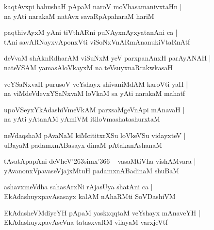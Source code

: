 \documentclass[twoside,12pt,openright]{book}
\def\S{\char'263}
\newcounter{shloka}[chapter]
\begin{document}
\begin{shloka}
kaqtAvxpi bahushaH pApaM naroV moVhasamanivxtaHn |\\
na yAti narakaM natAvx savaRpApaharaM hariM 
\end{shloka}

\begin{shloka}
paqthivAyxM yAni tiVthARni puNAyxnAyxyatanAni ca |\\
tAni savARNayxvAponxVti viSoNxVnARmAnanukiVtaRnAtf 
\end{shloka}

\begin{shloka}
deVvaM shAknRdharAM viSuNxM yeV parxpanAnxH parAyANAH |\\
nateVSAM yamasAloVkayxM na teVsuyxnaRrakwkasaH 
\end{shloka}

\begin{shloka}
veYSaNxvaH purusoV veYshayx shivaniMdAM karoVti yaH |\\
na viMdeVdevxYSaNxvaM loVkaM sa yAti narakaM mahatf 
\end{shloka}

\begin{shloka}
upoVSeyxYkAdashiVmeVkAM parxsaMgeVnApi mAnavaH |\\
na yAti yAtanAM yAmiVM itiloVmashatashurxtaM 
\end{shloka}

\begin{shloka}
neVdaqshaM pAvaNaM kiMcititxrXSu loVkeVSu vidayxteV |\\
uBayaM padamxnABasayx dinaM pAtakanAshanaM 
\end{shloka}

\begin{shloka}
tAvatApapAni deVheV\S simx\char'366 ~ vasaMtiVha vishAMvara |\\
yAvanonxVpavaseVjajxMtuH padamxnABadinaM shuBaM 
\end{shloka}

\begin{shloka}
ashavxmeVdha sahasArxNi rAjasUya shatAni ca |\\
EkAdashuyxpavAsasayx kalAM nAhaRMti SoVDashiVM 
\end{shloka}

\begin{shloka}
EkAdasheVMdiyeYH pApaM yaskxqqtaM veYshayx mAnaveYH |\\
EkAdashuyxpavAseVna tatasxvaRM vilayaM varxjeVtf 
\end{shloka}
\end{document}
